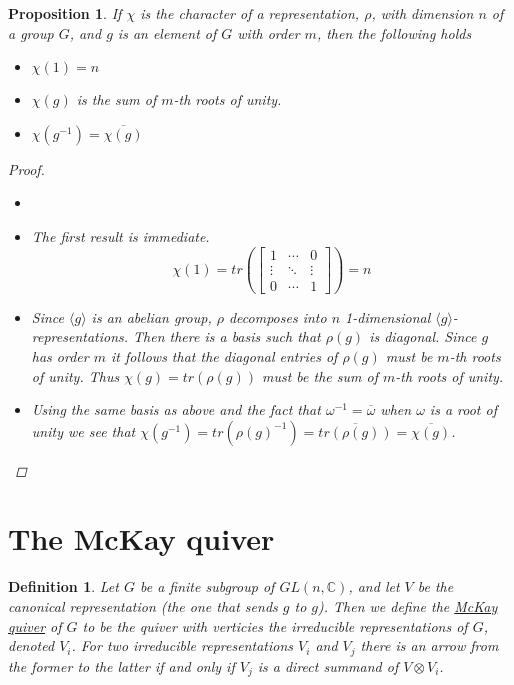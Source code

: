 \documentclass[11pt, a4paper, english]{article}
\newtheorem{prop}{Proposition}
\numberwithin{prop}{section}
\numberwithin{lemma}{section}
\numberwithin{theorem}{section}
\newtheorem{defin}{Definition}
\numberwithin{defin}{section}
\numberwithin{example}{section}
\newcommand{\C}{\mathbb{C}}
\begin{document}
\begin{prop}
If $\chi$ is the character of a representation, $\rho$, with dimension $n$ of a group $G$, and $g$ is an element of $G$ with order $m$, then the following holds
\begin{itemize}
 \item[(1)] $\chi(1) = n$
 \item[(2)] $\chi(g)$ is the sum of $m$-th roots of unity.
 \item[(3)] $\chi(g^{-1}) = \overline{\chi(g)}$
\end{itemize}
\begin{proof}

\begin{itemize}
\item[]
\item[(1)]
The first result is immediate.
$$\chi(1) = tr\left(\begin{bmatrix}
1 & \cdots & 0\\
\vdots & \ddots & \vdots\\
0 & \cdots & 1
\end{bmatrix}\right) = n$$
\item[(2)]
Since $\langle g \rangle$ is an abelian group, $\rho$ decomposes into $n$ 1-dimensional $\langle g \rangle$-representations. Then there is a basis such that $\rho(g)$ is diagonal. Since $g$ has order $m$ it follows that the diagonal entries of $\rho(g)$ must be $m$-th roots of unity. Thus $\chi(g) = tr(\rho(g))$ must be the sum of $m$-th roots of unity.
\item[(3)]
Using the same basis as above and the fact that $\omega^{-1} = \overline{\omega}$ when $\omega$ is a root of unity we see that $\chi(g^{-1}) = tr(\rho(g)^{-1}) = \overline{tr(\rho(g))} = \overline{\chi(g)}$.
\end{itemize}
\end{proof}
\end{prop}

\fi

\section{The McKay quiver}
\begin{defin}
Let $G$ be a finite subgroup of $GL(n, \C)$, and let $V$ be the canonical representation (the one that sends $g$ to $g$). Then we define the \underline{McKay quiver} of $G$ to be the quiver with verticies the irreducible representations of $G$, denoted $V_i$. For two irreducible representations $V_i$ and $V_j$ there is an arrow from the former to the latter if and only if $V_j$ is a direct summand of $V \otimes V_i$. 
\end{defin}
\end{document}
